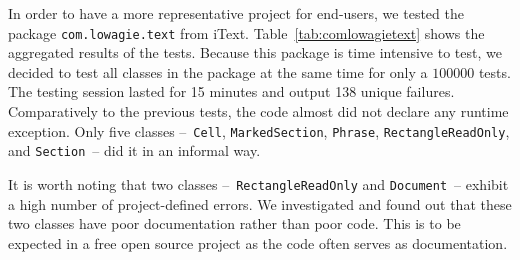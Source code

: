 In order to have a more representative project for end-users, we tested the package \texttt{com.lowagie.text} from iText. Table~\ref{tab:comlowagietext} shows the aggregated results of the tests. Because this package is time intensive to test, we decided to test all classes in the package at the same time for only a $100000$ tests. The testing session lasted for 15 minutes and output 138 unique failures. Comparatively to the previous tests, the code almost did not declare any runtime exception. Only five classes --~\texttt{Cell}, \texttt{MarkedSection}, \texttt{Phrase}, \texttt{RectangleReadOnly}, and \texttt{Section}~-- did it in an informal way. 

It is worth noting that two classes --~\texttt{RectangleReadOnly}  and \texttt{Document}~-- exhibit a high number of project-defined errors. We investigated and found out that these two classes have poor documentation rather than poor code. This is to be expected in a free open source project as the code often serves as documentation.


